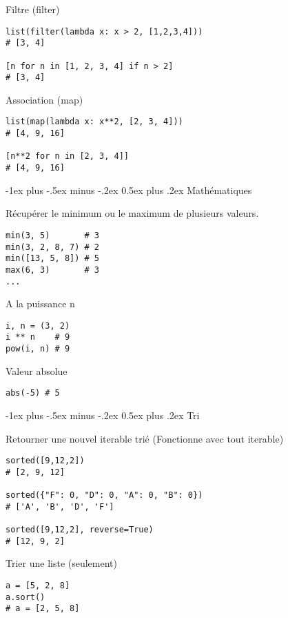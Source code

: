 \documentclass[10pt,landscape]{article}
\makeatletter
\renewcommand{\section}{\@startsection{section}{1}{0mm}%
                                {-1ex plus -.5ex minus -.2ex}%
                                {0.5ex plus .2ex}%
                                {\normalfont\large\bfseries}}
\makeatother
\begin{document}
\begin{multicols}{3}
Filtre (filter)
\begin{lstlisting}
list(filter(lambda x: x > 2, [1,2,3,4]))
# [3, 4]

[n for n in [1, 2, 3, 4] if n > 2]
# [3, 4]
\end{lstlisting}

Association (map)
\begin{lstlisting}
list(map(lambda x: x**2, [2, 3, 4]))
# [4, 9, 16]

[n**2 for n in [2, 3, 4]]
# [4, 9, 16]
\end{lstlisting}

\section{Mathématiques}

Récupérer le minimum ou le maximum de plusieurs valeurs.
\begin{lstlisting}
min(3, 5)       # 3
min(3, 2, 8, 7) # 2
min([13, 5, 8]) # 5
max(6, 3)       # 3
...
\end{lstlisting}

A la puissance n
\begin{lstlisting}
i, n = (3, 2)
i ** n    # 9
pow(i, n) # 9
\end{lstlisting}

Valeur absolue
\begin{lstlisting}
abs(-5) # 5
\end{lstlisting}

\section{Tri}

Retourner une nouvel iterable trié
(Fonctionne avec tout iterable)
\begin{lstlisting}
sorted([9,12,2])
# [2, 9, 12]

sorted({"F": 0, "D": 0, "A": 0, "B": 0})
# ['A', 'B', 'D', 'F']

sorted([9,12,2], reverse=True)
# [12, 9, 2]
\end{lstlisting}

Trier une liste (seulement)
\begin{lstlisting}
a = [5, 2, 8]
a.sort()
# a = [2, 5, 8]
\end{lstlisting}



\end{multicols}
\end{document}
